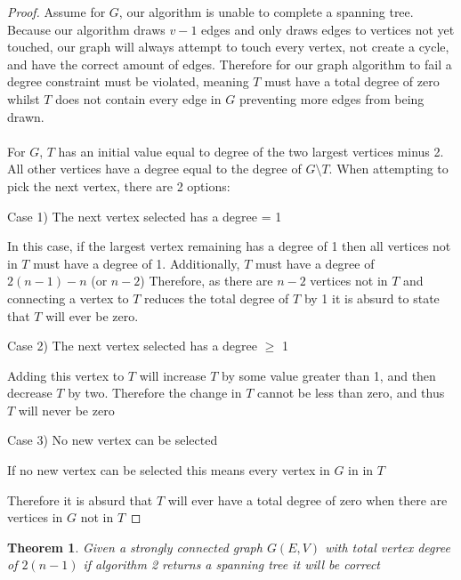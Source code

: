 \documentclass{article}
\newtheorem{theorem}{Theorem}
\begin{document}
\begin{proof}
Assume for $G$, our algorithm is unable to complete a spanning tree. Because our algorithm draws $v-1$ edges and only draws edges to vertices not yet touched, our graph will always attempt to touch every vertex, not create a cycle, and have the correct amount of edges. Therefore for our graph algorithm to fail a degree constraint must be violated, meaning $T$ must have a total degree of zero whilst $T$ does not contain every edge in $G$ preventing more edges from being drawn.
\\
\\
For $G$, $T$ has an initial value equal to degree of the two largest vertices minus 2. All other vertices have a degree equal to the degree of $G \setminus T$. When attempting to pick the next vertex, there are 2 options:\par
    \setlength\parindent{12pt} 
    Case 1) The next vertex selected has a degree = 1 \par
        \setlength\parindent{24pt}\hangindent=24pt 
        In this case, if the largest vertex remaining has a degree of 1 then all vertices not in $T$ must
        have a degree of 1. Additionally, $T$ must have a degree of $2(n-1)-n$ (or $n-2$) Therefore, as there are $n-2$ vertices not in $T$ and connecting
        a vertex to $T$ reduces the total degree of $T$ by 1 it is absurd to state that $T$ will ever be zero.
        \par
        
    \setlength\parindent{12pt}
    Case 2) The next vertex selected has a degree $\geq$ 1\par
        \setlength\parindent{24pt}\hangindent=24pt 
        Adding this vertex to $T$ will increase $T$ by some value greater than 1, and then decrease $T$ by two.
        Therefore the change in $T$ cannot be less than zero, and thus $T$ will never be zero
        \par

    \setlength\parindent{12pt}
    Case 3) No new vertex can be selected\par
        \setlength\parindent{24pt}\hangindent=24pt 
        If no new vertex can be selected this means every vertex in $G$ in in $T$
        \par
        
    \setlength\parindent{0pt}\hangindent=0pt
    Therefore it is absurd that $T$ will ever have a total degree of zero when there are vertices in $G$ not in $T$

\end{proof}
\clearpage 
\begin{theorem}
Given a strongly connected graph $G(E,V)$ with total vertex degree of $2(n-1)$ if algorithm 2 returns a spanning tree it will be correct
\end{theorem}
\end{document}
